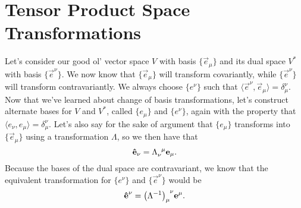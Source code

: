 \chapter{Tensor Product Space Transformations}
Let's consider our good ol' vector space $V$ with basis $\{\vec{e}_\mu\}$ and its dual space $V^*$ with basis $\{\vec{e}^\nu\}$.
We now know that $\{\vec{e}_\mu\}$ will transform covariantly, while $\{\vec{e}^\nu\}$ will transform contravariantly.
We always choose $\{e^\nu\}$ such that $\langle \vec{e}^\nu, \vec{e}_\mu \rangle = \delta^\nu_\mu$.
Now that we've learned about change of basis transformations, let's construct alternate bases for $V$ and $V^*$, called $\{\unit{e}_\mu\}$ and $\{\unit{e}^\nu\}$, again with the property that $\langle \unit{e}_\nu, \unit{e}_\mu \rangle = \delta_\mu^\nu$.
Let's also say for the sake of argument that $\{\unit{e}_\mu\}$ transforms into $\{\vec{e}_\mu\}$ using a transformation $\Lambda$, so we then have that
\[ \unit{e}_\nu = \tensor{\Lambda}{_\nu^\mu} \vec{e}_\mu. \]
Because the bases of the dual space are contravariant, we know that the equivalent transformation for $\{\unit{e}^\nu\}$ and $\{\vec{e}^\nu\}$ would be
\[ \unit{e}^\nu = \tensor{\qty(\Lambda^{-1})}{_\mu^\nu} \vec{e}^\mu. \]

